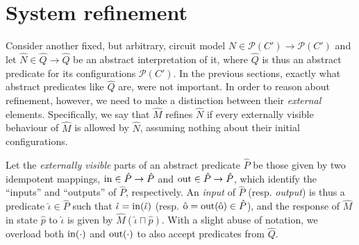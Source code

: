 \section{System refinement}

Consider another fixed, but arbitrary, circuit model $N \in \mathcal{P}(C') \rightarrow \mathcal{P}(C')$ and let $\hat N \in \hat Q \rightarrow \hat Q$ be an abstract interpretation of it, where $\hat Q$ is thus an abstract predicate for its configurations $\mathcal{P}(C')$. In the previous sections, exactly what abstract predicates like $\hat Q$ are, were not important. In order to reason about refinement, however, we need to make a distinction between their \textit{external} elements. Specifically, we say that $\hat M$ refines $\hat N$ if every externally visible behaviour of $\hat M$ is allowed by $\hat N$, assuming nothing about their initial configurations.

Let the \textit{externally visible} parts of an abstract predicate $\hat P$ be those given by two idempotent mappings, $\operatorname{in} \in \hat P \rightarrow \hat P$ and $\operatorname{out} \in \hat P \rightarrow \hat P$, which identify the ``inputs'' and ``outputs'' of $\hat P$, respectively. An \textit{input} of $\hat P$ (resp. \textit{output}) is thus a predicate $\hat \iota \in \hat P$ such that $\hat \iota = \operatorname{in}(\hat \iota)$ (resp. $\hat {\mathrm{o}} = \operatorname{out}(\hat {\mathrm{o}}) \in \hat P$), and the response of $\hat M$ in state $\hat p$ to $\hat \iota$ is given by $\hat M(\hat \iota \sqcap \hat p)$. With a slight abuse of notation, we overload both $\operatorname{in}(\cdot)$ and $\operatorname{out}(\cdot)$ to also accept predicates from $\hat Q$.





